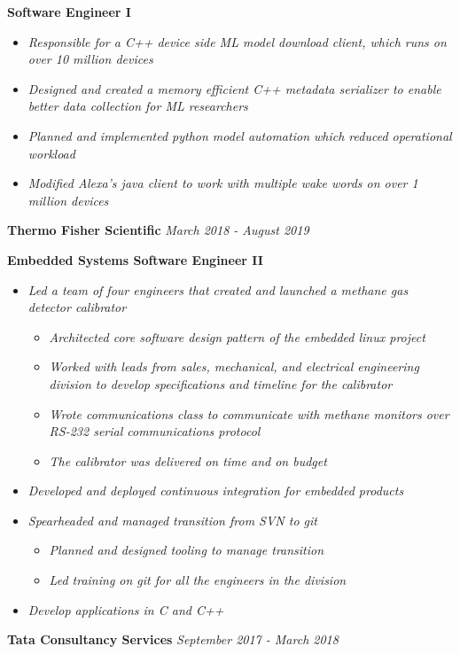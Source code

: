 \documentclass[8pt]{extarticle}
\begin{document}
{\tiny }
\textbf{Software Engineer I}
\begin{itemize}
	\item \textit{Responsible for a C++ device side ML model download client, which runs on over 10 million devices}
	\item \textit{Designed and created a memory efficient C++ metadata serializer to enable better data collection for ML researchers}
	\item \textit{Planned  and implemented python model automation which reduced operational workload}	
	\item \textit{Modified Alexa's java client to work with multiple wake words on over 1 million devices}
\end{itemize}
\textbf{Thermo Fisher Scientific} \hfill\textit{March 2018 - August 2019}

{\tiny }
\textbf{Embedded Systems Software Engineer II}
\begin{itemize}
	\item \textit{Led a team of four engineers that created and launched a methane gas detector calibrator}
		\begin{itemize}
		\item \textit{Architected core software design pattern of the embedded linux project}
		\item \textit{Worked  with leads from sales, mechanical, and electrical engineering division to develop specifications and timeline for the calibrator}
		\item \textit{Wrote communications class to communicate with methane monitors over RS-232 serial communications protocol }
		\item \textit{The calibrator was delivered on time and on budget }
	\end{itemize}
	\item \textit{Developed and deployed continuous integration for embedded products}
	\item \textit{Spearheaded and managed transition from SVN to git}
		\begin{itemize}
		\item \textit{Planned and designed tooling to manage transition }
		\item \textit{Led training on git for all the engineers in the division}
	\end{itemize}
	\item \textit{Develop applications in C and C++}
\end{itemize}
\textbf{Tata Consultancy Services} \hfill\textit{September 2017 - March 2018}
\end{document}

